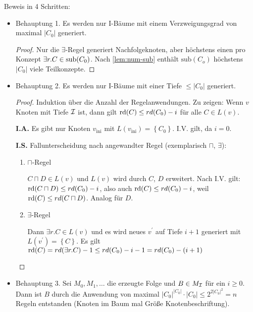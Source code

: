Beweis in 4 Schritten:
\begin{itemize}
    \item Behauptung 1.
  Es werden nur I-Bäume mit einem Verzweigungsgrad
  von maximal $|C_0|$ generiert.
  \begin{tafel} \begin{proof}
        Nur die $\exists$-Regel generiert Nachfolgeknoten, aber
        höchstens einen pro Konzept $\exists r.C \in \operatorname{sub}(C_0)$. Nach
        \autoref{lem:num-sub}  enthält
        $\text{sub}\left( C_{o} \right)$ höchstens $\left| C_{0} \right|$
        viele Teilkonzepte.
    \end{proof}\end{tafel}
\item Behauptung 2.
  Es werden nur I-Bäume mit einer Tiefe $\leq \left| C_{0} \right|$
  generiert.
    \begin{tafel} \begin{proof}

Induktion über die Anzahl der Regelanwendungen. Zu zeigen: Wenn $v$
Knoten mit Tiefe $\mathcal{I}$ ist, dann gilt
$\rd\left( C \right) \leq rd\left( C_{0} \right) - i$ für alle
$C \in L\left( v \right)$.

\textbf{I.A.} Es gibt nur Knoten $v_{\text{ini}}$ mit
$L\left( v_{\text{ini}} \right) = \left\{ C_{0} \right\}$. I.V. gilt,
da $i = 0$.

\textbf{I.S.} Fallunterscheidung nach angewandter Regel (exemplarisch
$\sqcap$, $\exists$):

\begin{enumerate}
\item $\sqcap$-Regel

    $C \sqcap D \in L(v)$ und $L(v)$ wird durch $C$, $D$ erweitert.
Nach I.V. gilt:
$\rd\left( C \sqcap D \right) \leq rd\left( C_{0} \right) - i$,
also auch $\rd\left( C \right) \leq rd\left( C_{0} \right) - i$,
weil $\rd\left( C \right) \leq rd\left( C \sqcap D \right)$.
Analog für $D$.

\item $\exists$-Regel

Dann $\exists r.C \in L\left( v \right)$ und es wird neues $v^{'}$
auf Tiefe $i + 1$ generiert mit
$L\left( v^{'} \right) = \left\{ C \right\}$. Es gilt
$\rd\left( C \right) = rd\left( \exists r.C \right) - 1 \leq rd\left( C_{0} \right) - i - 1 = rd\left( C_{0} \right) - (i + 1)$
 \end{enumerate}
\end{proof}
\end{tafel}

\item Behauptung 3.
  Sei $M_{0},M_1,\ldots$ die erzeugte Folge und $B \in M_{\mathcal{I}}$ für
  ein $i \geq 0$. Dann ist $B$ durch die Anwendung von maximal
  $\left| C_{0} \right|^{\left| C_{0} \right|} \cdot \left| C_{0} \right| \leq 2^{2\left| C_{0} \right|^{2}} = n$ Regeln entstanden (Knoten im Baum mal Größe Knotenbeschriftung).

\end{itemize}

